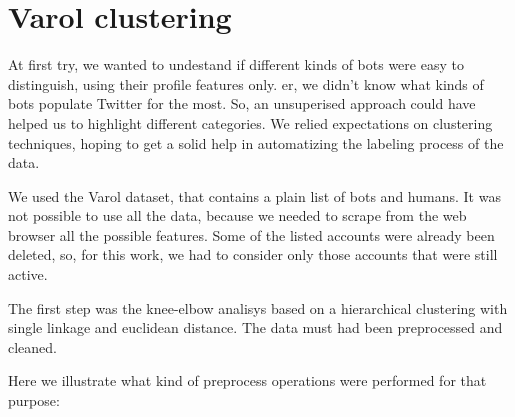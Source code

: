 \section{Varol clustering}
At first try, we wanted to undestand if different kinds of bots were easy to distinguish, using their profile features only. er, we didn't know what kinds of bots populate Twitter for the most. So, an unsuperised approach could have helped us to highlight different categories. We relied expectations on clustering techniques, hoping to get a solid help in automatizing the labeling process of the data.

We used the Varol dataset\cite{Varol}, that contains a plain list of bots and humans.
It was not possible to use all the data, because we needed to scrape from the web browser all the possible features. Some of the listed accounts were already been deleted, so, for this work, we had to consider only those accounts that were still active.

The first step was the knee-elbow analisys based on a hierarchical clustering with single linkage and euclidean distance. The data must had been preprocessed and cleaned.

Here we illustrate what kind of preprocess operations were performed for that purpose:

